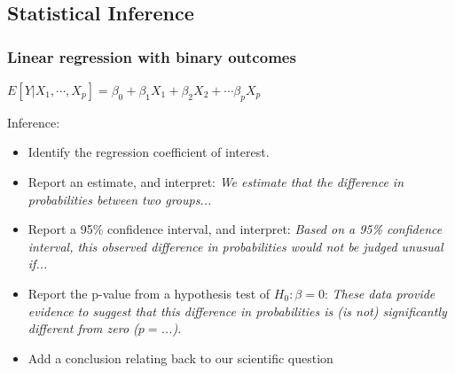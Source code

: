 \documentclass[12pt, 
hyperref={colorlinks=true, linkcolor=blue, urlcolor=cyan}]{beamer}
\begin{document}
\subsection{Statistical Inference}
\begin{frame}
\frametitle{Linear regression with binary outcomes}
\begin{center} $E[Y|X_1,\cdots,X_p] = \beta_0 + \beta_1 X_1 + \beta_2 X_2 + \cdots \beta_p X_p$ \end{center}

\vspace{-0.6cm}
\color{blue} Inference: \vspace{-0.3cm} \color{black}
\begin{itemize}
\item Identify the regression coefficient of interest. \pause %
\item Report an estimate, and interpret: \textit{We estimate that the difference in probabilities between two groups...} \pause %
\item Report a 95\% confidence interval, and interpret: \textit{Based on a 95\% confidence interval, this observed difference in probabilities would not be judged unusual if...} \pause
\item Report the p-value from a hypothesis test of $H_0: \beta = 0$: \textit{These data provide evidence to suggest that this difference in probabilities is (is not) significantly different from zero ($p =$...).} \pause
\item Add a conclusion relating back to our scientific question
\end{itemize}
\end{frame}
\end{document}
